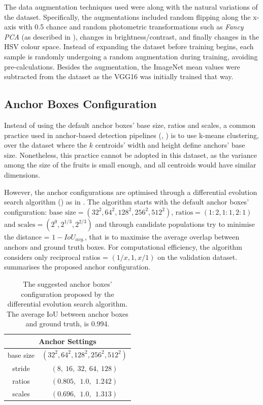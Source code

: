The data augmentation techniques used were along with the natural variations of the dataset. Specifically, the augmentations included random flipping along the x-axis with 0.5 chance and random photometric transformations such as \textit{Fancy PCA} (as described in \cite{taylor2017improving}), changes in brightness/contrast, and finally changes in the HSV colour space. Instead of expanding the dataset before training begins, each sample is randomly undergoing a random augmentation during training, avoiding pre-calculations. Besides the augmentation, the ImageNet mean values were subtracted from the dataset as the VGG16 was initially trained that way.

\subsection{Anchor Boxes Configuration}
Instead of using the default anchor boxes' base size, ratios and scales, a common practice used in anchor-based detection pipelines (\cite{redmon2017yolo9000}, \cite{redmon2018yolov3}) is to use k-means clustering, over the dataset where the $k$ centroids' width and height define anchors' base size. Nonetheless, this practice cannot be adopted in this dataset, as the variance among the size of the fruits is small enough, and all centroids would have similar dimensions.

However, the anchor configurations are optimised through a differential evolution search algorithm (\cite{storn1997differential}) as in \cite{zlocha2019improving}. The algorithm starts with the default anchor boxes' configuration: $\text{base size} = (32^2, 64^2, 128^2, 256^2, 512^2)$, $\text{ratios} = (1\!:\!2, 1\!:\!1, 2\!:\!1)$ and $\text{scales} = (2^{0}, 2^{1/3}, 2^{2/3})$ and through candidate populations try to minimise the distance = $1 - IoU_{avg.}$, that is to maximise the average overlap between anchors and ground truth boxes. For computational efficiency, the algorithm considers only reciprocal ratios = $(1/x, 1, x/1)$ on the validation dataset.  summarises the proposed anchor configuration. \\

\begin{table}[!htb]
  \centering
  \begin{tabular}{cc}
  \toprule
  \multicolumn{2}{c}{\textbf{Anchor Settings}} \\
  \midrule
base size	& 	\small{$(32^2, 64^2, 128^2, 256^2, 512^2)$} \\
stride 	& 	$(8, \ 16, \ 32, \ 64, \ 128)$ \\
ratios  	&	$(0.805, \ \ 1.0, \ \ 1.242)$ \\
scales  	& 	$(0.696, \ \ 1.0, \ \ 1.313)$ \\
  \bottomrule
  \end{tabular}
  \caption{The suggested anchor boxes' configuration proposed by the differential evolution search algorithm. The average IoU between anchor boxes and ground truth, is 0.994.}
  \label{tab2}
\end{table}

